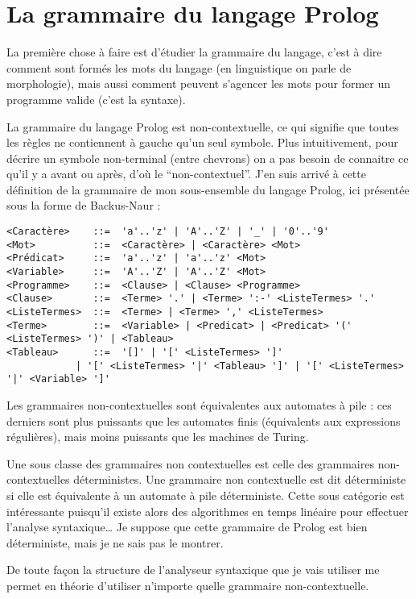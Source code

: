 \documentclass{article}
\begin{document}
\section{La grammaire du langage Prolog}

La première chose à faire est d'étudier la grammaire du langage, c'est à dire comment sont formés les mots du langage (en linguistique on parle de morphologie), mais aussi comment peuvent s'agencer les mots pour former un programme valide (c'est la syntaxe).

La grammaire du langage Prolog est non-contextuelle, ce qui signifie que toutes les règles ne contiennent à gauche qu'un seul symbole. Plus intuitivement, pour décrire un symbole non-terminal (entre chevrons) on a pas besoin de connaitre ce qu'il y a avant ou après, d'où le ``non-contextuel''. J'en suis arrivé à cette définition de la grammaire de mon sous-ensemble du langage Prolog, ici présentée sous la forme de Backus-Naur :

\begin{verbatim}
<Caractère>    ::=  'a'..'z' | 'A'..'Z' | '_' | '0'..'9'
<Mot>          ::=  <Caractère> | <Caractère> <Mot>
<Prédicat>     ::=  'a'..'z' | 'a'..'z' <Mot>
<Variable>     ::=  'A'..'Z' | 'A'..'Z' <Mot>
<Programme>    ::=  <Clause> | <Clause> <Programme>
<Clause>       ::=  <Terme> '.' | <Terme> ':-' <ListeTermes> '.'
<ListeTermes>  ::=  <Terme> | <Terme> ',' <ListeTermes>
<Terme>        ::=  <Variable> | <Predicat> | <Predicat> '(' <ListeTermes> ')' | <Tableau>
<Tableau>      ::=  '[]' | '[' <ListeTermes> ']'
            | '[' <ListeTermes> '|' <Tableau> ']' | '[' <ListeTermes> '|' <Variable> ']'
\end{verbatim}

Les grammaires non-contextuelles sont équivalentes aux automates à pile : ces derniers sont plus puissants que les automates finis (équivalents aux expressions régulières), mais moins puissants que les machines de Turing.

Une sous classe des grammaires non contextuelles est celle des grammaires non-contextuelles déterministes. Une grammaire non contextuelle est dit déterministe si elle est équivalente à un automate à pile déterministe. Cette sous catégorie est intéressante puisqu'il existe alors des algorithmes en temps linéaire pour effectuer l'analyse syntaxique\ldots{} Je suppose que cette grammaire de Prolog est bien déterministe, mais je ne sais pas le montrer.

De toute façon la structure de l'analyseur syntaxique que je vais utiliser me permet en théorie d'utiliser n'importe quelle grammaire non-contextuelle.
\end{document}
